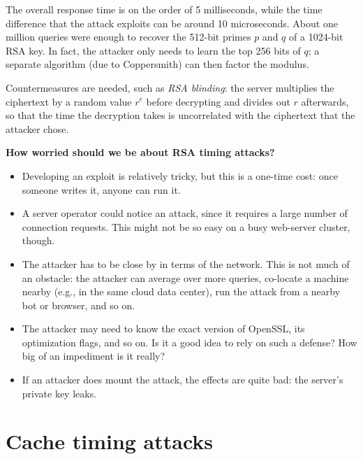 \documentclass[
  letterpaper,
]{scrbook}
\theoremstyle{definition}
\theoremstyle{plain}
\theoremstyle{plain}
\theoremstyle{remark}
\begin{document}
The overall response time is on the order of 5 milliseconds, while the
time difference that the attack exploits can be around 10 microseconds.
{} About one million queries were
enough to recover the 512-bit primes \(p\) and \(q\) of a 1024-bit RSA
key. In fact, the attacker only needs to learn the top 256 bits of
\(q\); a separate algorithm (due to Coppersmith) can then factor the
modulus.

Countermeasures are needed, such as \emph{RSA blinding}: the server
multiplies the ciphertext by a random value \(r^e\) before decrypting
and divides out \(r\) afterwards, so that the time the decryption takes
is uncorrelated with the ciphertext that the attacker chose.

\textbf{How worried should we be about RSA timing attacks?}

\begin{itemize}
\item
  Developing an exploit is relatively tricky, but this is a one-time
  cost: once someone writes it, anyone can run it.
\item
  A server operator could notice an attack, since it requires a large
  number of connection requests. This might not be so easy on a busy
  web-server cluster, though.
\item
  The attacker has to be close by in terms of the network. This is not
  much of an obstacle: the attacker can average over more queries,
  co-locate a machine nearby (e.g., in the same cloud data center), run
  the attack from a nearby bot or browser, and so on.
\item
  The attacker may need to know the exact version of OpenSSL, its
  optimization flags, and so on. Is it a good idea to rely on such a
  defense? How big of an impediment is it really?
\item
  If an attacker does mount the attack, the effects are quite bad: the
  server's private key leaks.
\end{itemize}

\section{Cache timing attacks}\label{cache-timing-attacks}
\end{document}
